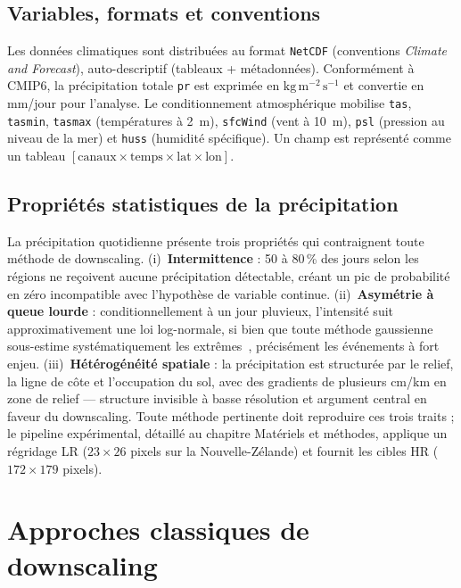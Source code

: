 \documentclass[14pt,a4paper,openany]{extreport}
\theoremstyle{definition}
\begin{document}
\subsection{Variables, formats et conventions}
\label{ssec:formats}

Les données climatiques sont distribuées au format \texttt{NetCDF} (conventions \emph{Climate and Forecast}), auto-descriptif (tableaux + métadonnées). Conformément à CMIP6, la précipitation totale \texttt{pr} est exprimée en $\mathrm{kg}\,\mathrm{m}^{-2}\,\mathrm{s}^{-1}$ et convertie en mm/jour pour l'analyse. Le conditionnement atmosphérique mobilise \texttt{tas}, \texttt{tasmin}, \texttt{tasmax} (températures à 2~m), \texttt{sfcWind} (vent à 10~m), \texttt{psl} (pression au niveau de la mer) et \texttt{huss} (humidité spécifique). Un champ est représenté comme un tableau $[\text{canaux} \times \text{temps} \times \text{lat} \times \text{lon}]$.

\subsection{Propriétés statistiques de la précipitation}
\label{ssec:stats-precip}

La précipitation quotidienne présente trois propriétés qui contraignent toute méthode de downscaling. (i)~\textbf{Intermittence} : 50 à 80\,\% des jours selon les régions ne reçoivent aucune précipitation détectable, créant un pic de probabilité en zéro incompatible avec l'hypothèse de variable continue. (ii)~\textbf{Asymétrie à queue lourde} : conditionnellement à un jour pluvieux, l'intensité suit approximativement une loi log-normale, si bien que toute méthode gaussienne sous-estime systématiquement les extrêmes~\cite{maraun_widmann_2018}, précisément les événements à fort enjeu. (iii)~\textbf{Hétérogénéité spatiale} : la précipitation est structurée par le relief, la ligne de côte et l'occupation du sol, avec des gradients de plusieurs cm/km en zone de relief --- structure invisible à basse résolution et argument central en faveur du downscaling. Toute méthode pertinente doit reproduire ces trois traits ; le pipeline expérimental, détaillé au chapitre Matériels et méthodes, applique un régridage LR ($23 \times 26$ pixels sur la Nouvelle-Zélande) et fournit les cibles HR ($172 \times 179$ pixels).
\label{fig:lognormal}

\section{Approches classiques de downscaling}
\label{sec:classiques}
\end{document}
